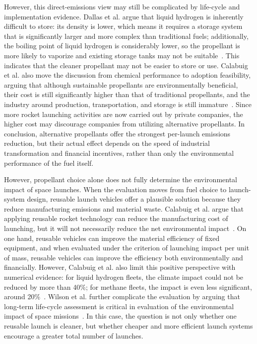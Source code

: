 \documentclass[12pt]{article}
\begin{document}
However, this direct-emissions view may still be complicated by life-cycle and implementation evidence. Dallas et al. argue that liquid hydrogen is inherently difficult to store: its density is lower, which means it requires a storage system that is significantly larger and more complex than traditional fuels; additionally, the boiling point of liquid hydrogen is considerably lower, so the propellant is more likely to vaporize and existing storage tanks may not be suitable~\citep{dallas2020review}. This indicates that the cleaner propellant may not be easier to store or use. Calabuig et al. also move the discussion from chemical performance to adoption feasibility, arguing that although sustainable propellants are environmentally beneficial, their cost is still significantly higher than that of traditional propellants, and the industry around production, transportation, and storage is still immature~\citep{calabuig2024reusable}. Since more rocket launching activities are now carried out by private companies, the higher cost may discourage companies from utilizing alternative propellants. In conclusion, alternative propellants offer the strongest per-launch emissions reduction, but their actual effect depends on the speed of industrial transformation and financial incentives, rather than only the environmental performance of the fuel itself.



However, propellant choice alone does not fully determine the environmental impact of space launches. When the evaluation moves from fuel choice to launch-system design, reusable launch vehicles offer a plausible solution because they reduce manufacturing emissions and material waste. Calabuig et al. argue that applying reusable rocket technology can reduce the manufacturing cost of launching, but it will not necessarily reduce the net environmental impact~\citep{calabuig2024reusable}. On one hand, reusable vehicles can improve the material efficiency of fixed equipment, and when evaluated under the criterion of launching impact per unit of mass, reusable vehicles can improve the efficiency both environmentally and financially. However, Calabuig et al. also limit this positive perspective with numerical evidence: for liquid hydrogen fleets, the climate impact could not be reduced by more than 40\%; for methane fleets, the impact is even less significant, around 20\%~\citep{calabuig2024reusable}. Wilson et al. further complicate the evaluation by arguing that long-term life-cycle assessment is critical in evaluation of the environmental impact of space missions~\citep{wilson2022lifecycle}. In this case, the question is not only whether one reusable launch is cleaner, but whether cheaper and more efficient launch systems encourage a greater total number of launches.
\end{document}
